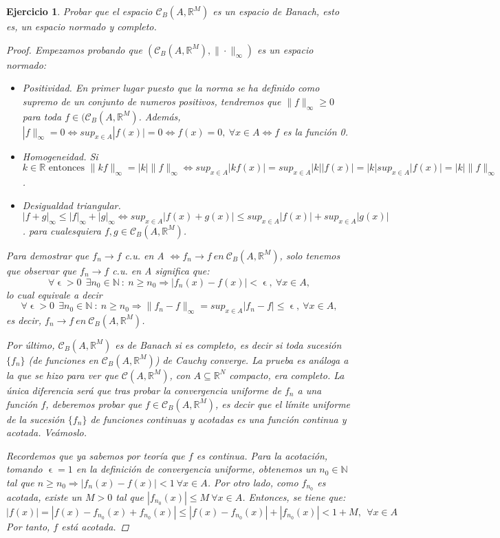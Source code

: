 \documentclass[11pt, a4paper]{article}
\let\epsilon\upvarepsilon
\theoremstyle{theorem-style}
\theoremstyle{definition-style}
\newtheorem{ejer}{Ejercicio}[section]
\theoremstyle{remark-style}
\theoremstyle{example-style}
\begin{document}
\begin{ejer}
  Probar que el espacio $\mathcal{C}_B(A,\mathbb{R}^M)$ es un espacio de Banach, esto es, un espacio normado y completo.

  \begin{proof}
    Empezamos probando que $(\mathcal{C}_B(A, \mathbb R^M), \|\cdot \|_\infty)$ es un espacio normado:
    \begin{itemize}
      
    \item  Positividad. En primer lugar puesto que la norma se ha definido como supremo de un conjunto de numeros positivos, tendremos que $\|f\|_\infty \geq 0$ para toda $f\in (\mathcal{C}_B(A, \mathbb R^M)$. Además, $|f\|_\infty=0 \iff sup_{x \in A}|f(x)|=0 \iff f(x)=0, \ \forall x \in A \iff f$ es la función 0.
    \item Homogeneidad. Si $k \in \mathbb R \text{ entonces } \|kf\|_\infty=|k|\|f\|_\infty \iff sup_{x \in A}|kf(x)|=sup_{x \in A}|k||f(x)|=|k|sup_{x \in A}|f(x)| = |k| \| f\|_\infty$.
    \item Desigualdad triangular.
      $|f+g|_\infty \leq |f|_\infty + |g|_\infty\iff sup_{x \in A}|f(x)+g(x)| \leq sup_{x \in A}|f(x)| + sup_{x \in A}|g(x)|$.
      para cualesquiera $f, g \in \mathcal{C}_B(A, \mathbb R^M)$.
    \end{itemize}

    Para demostrar que ${f_n} \to f$  c.u. en A $\iff f_n \to f\ en\ \mathcal{C}_B(A, \mathbb R^M)$, solo tenemos que observar que ${f_n} \to f$  c.u. en A  significa que: $$\forall \epsilon>0 \ \ \exists n_0\in \mathbb N \ :\ n\geq n_0 \Rightarrow |f_n(x)-f(x) |<\epsilon , \ \forall x\in A,$$
    lo cual equivale a decir $$\forall \epsilon>0 \ \ \exists n_0\in \mathbb N \ :\ n\geq n_0 \Rightarrow \|f_n-f\|_\infty = sup_{x \in A} |f_n-f| \leq \epsilon , \ \forall x\in A,$$
    es decir, $f_n \to f\ en\ \mathcal{C}_B(A, \mathbb R^M)$.
    
    Por último, $\mathcal{C}_B(A, \mathbb R^M)$ es de Banach si es completo, es decir si toda sucesión $\{ f_n\}$ (de funciones en $\mathcal{C}_B(A, \mathbb R^M)$) de Cauchy converge. La prueba es análoga a la que se hizo para ver que $\mathcal{C}(A,\mathbb{R}^M)$, con $A \subseteq \mathbb{R}^N$ compacto, era completo. La única diferencia será que tras probar la convergencia uniforme de $f_n$ a una función  $f$, deberemos probar que $f\in \mathcal{C}_B(A,\mathbb{R}^M)$, es decir que el límite uniforme de la sucesión $\{f_n\}$ de funciones continuas y acotadas es una función continua y acotada. Veámoslo.

    Recordemos que ya sabemos por teoría que $f$ es continua. Para la acotación, tomando $\epsilon = 1$ en la definición de convergencia uniforme, obtenemos un $n_0 \in \mathbb{N}$ tal que $n \ge n_0 \Rightarrow |f_n(x) - f(x)| < 1\ \forall x \in A$. Por otro lado, como $f_{n_0}$ es acotada, existe un $M>0$ tal que $|f_{n_0}(x)| \le M\ \forall x \in A$. Entonces, se tiene que: $$|f(x)| = |f(x) - f_{n_0}(x) + f_{n_0}(x)| \le |f(x) - f_{n_0}(x)| + |f_{n_0}(x)| < 1 + M, \ \ \forall x \in A$$
    Por tanto, $f$ está acotada.
  \end{proof}
\end{ejer}
\end{document}
